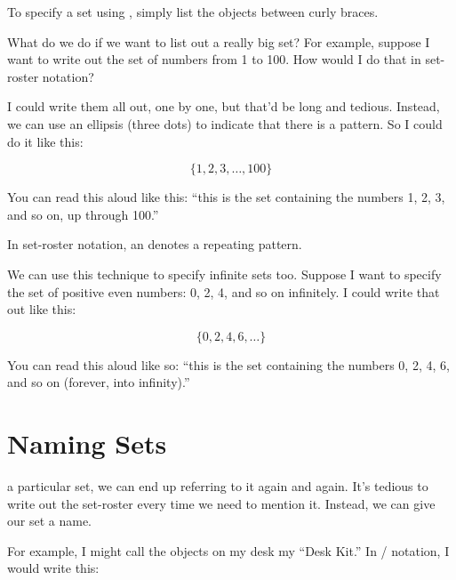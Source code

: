 \documentclass[../../../main.tex]{subfiles}
\begin{document}
\begin{terminology}
  To specify a set using , simply list the objects between curly braces. 
\end{terminology}

What do we do if we want to list out a really big set? For example, suppose I want to write out the set of numbers from 1 to 100. How would I do that in set-roster notation?

I could write them all out, one by one, but that'd be long and tedious. Instead, we can use an ellipsis (three dots) to indicate that there is a pattern. So I could do it like this:

\begin{equation*}
  \{ 1, 2, 3, \ldots, 100 \}
\end{equation*}

You can read this aloud like this: ``this is the set containing the numbers 1, 2, 3, and so on, up through 100.''

\begin{aside}
  \begin{notation}
    In set-roster notation, an  denotes a repeating pattern.
  \end{notation}
\end{aside}

We can use this technique to specify infinite sets too. Suppose I want to specify the set of positive even numbers: 0, 2, 4, and so on infinitely. I could write that out like this:

\begin{equation*}
  \{ 0, 2, 4, 6, \ldots \}
\end{equation*}
 
You can read this aloud like so: ``this is the set containing the numbers 0, 2, 4, 6, and so on (forever, into infinity).''


\section{Naming Sets}

 a particular set, we can end up referring to it again and again. It's tedious to write out the set-roster every time we need to mention it. Instead, we can give our set a name. 

For example, I might call the objects on my desk my ``Desk Kit.'' In \mathical/ notation, I would write this:
\end{document}
